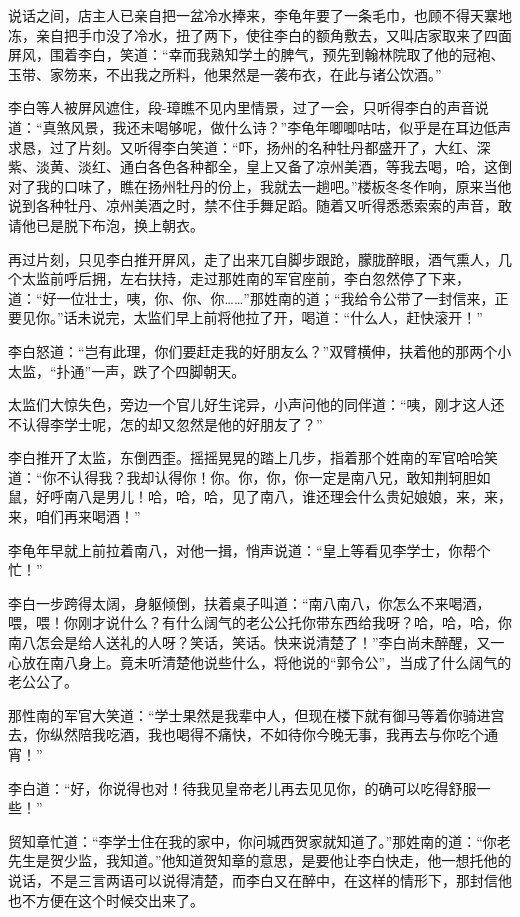 \documentclass[12pt,oneside]{book}
\begin{document}
说话之间，店主人已亲自把一盆冷水捧来，李龟年要了一条毛巾，也顾不得天寨地冻，亲自把手巾没了冷水，扭了两下，使往李白的额角敷去，又叫店家取来了四面屏风，围着李白，笑道：``幸而我熟知学土的脾气，预先到翰林院取了他的冠袍、玉带、家笏来，不出我之所料，他果然是一袭布衣，在此与诸公饮酒。''

李白等人被屏风遮住，段-璋瞧不见内里情景，过了一会，只听得李白的声音说道：``真煞风景，我还未喝够呢，做什么诗？''李龟年唧唧咕咕，似乎是在耳边低声求恳，过了片刻。又听得李白笑道：``吓，扬州的名种牡丹都盛开了，大红、深紫、淡黄、淡红、通白各色各种都全，皇上又备了凉州美酒，等我去喝，哈，这倒对了我的口味了，瞧在扬州牡丹的份上，我就去一趟吧。''楼板冬冬作响，原来当他说到各种牡丹、凉州美酒之时，禁不住手舞足蹈。随着又听得悉悉索索的声音，敢请他已是脱下布泡，换上朝衣。

再过片刻，只见李白推开屏风，走了出来兀自脚步跟跄，朦胧醉眼，酒气熏人，几个太监前呼后拥，左右扶持，走过那姓南的军官座前，李白忽然停了下来，道：``好一位壮士，咦，你、你、你\ldots\ldots{}''那姓南的道；``我给令公带了一封信来，正要见你。''话未说完，太监们早上前将他拉了开，喝道：``什么人，赶快滚开！''

李白怒道：``岂有此理，你们要赶走我的好朋友么？''双臂横伸，扶着他的那两个小太监，``扑通''一声，跌了个四脚朝天。

太监们大惊失色，旁边一个官儿好生诧异，小声问他的同伴道：``咦，刚才这人还不认得李学士呢，怎的却又忽然是他的好朋友了？''

李白推开了太监，东倒西歪。摇摇晃晃的踏上几步，指着那个姓南的军官哈哈笑道：``你不认得我？我却认得你！你。你，你，你一定是南八兄，敢知荆轲胆如鼠，好呼南八是男儿！哈，哈，哈，见了南八，谁还理会什么贵妃娘娘，来，来，来，咱们再来喝酒！''

李龟年早就上前拉着南八，对他一揖，悄声说道：``皇上等看见李学士，你帮个忙！''

李白一步跨得太阔，身躯倾倒，扶着桌子叫道：``南八南八，你怎么不来喝酒，喂，喂！你刚才说什么？有什么阔气的老公公托你带东西给我呀？哈，哈，哈，你南八怎会是给人送礼的人呀？笑话，笑话。快来说清楚了！''李白尚未醉醒，又一心放在南八身上。竟未听清楚他说些什么，将他说的``郭令公''，当成了什么阔气的老公公了。

那性南的军官大笑道：``学士果然是我辈中人，但现在楼下就有御马等着你骑进宫去，你纵然陪我吃酒，我也喝得不痛快，不如待你今晚无事，我再去与你吃个通宵！''

李白道：``好，你说得也对！待我见皇帝老儿再去见见你，的确可以吃得舒服一些！''

贸知章忙道：``李学士住在我的家中，你问城西贺家就知道了。''那姓南的道：``你老先生是贺少监，我知道。''他知道贺知章的意思，是要他让李白快走，他一想托他的说话，不是三言两语可以说得清楚，而李白又在醉中，在这样的情形下，那封信他也不方便在这个时候交出来了。
\end{document}
